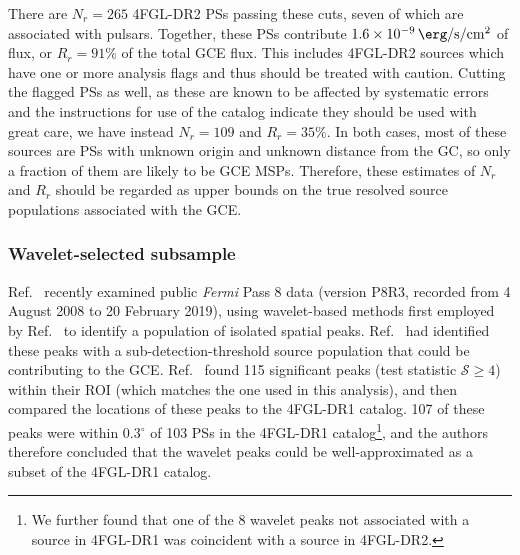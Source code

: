 \documentclass[letter,11pt]{article}
\begin{document}
There are $N_r=265$ 4FGL-DR2 PSs passing these cuts, seven of which are associated with pulsars. Together, these PSs contribute $\SI{1.6e-9}{\erg\per\second\per\centi\meter\squared}$ of flux, or $R_r = 91\%$ of the total GCE flux. This includes 4FGL-DR2 sources which have one or more analysis flags and thus should be treated with caution. Cutting the flagged PSs as well, as these are known to be affected by systematic errors and the instructions for use of the catalog indicate they should be used with great care, we have instead $N_r = 109$ and $R_r = 35\%$. In both cases, most of these sources are PSs with unknown origin and unknown distance from the GC, so only a fraction of them are likely to be GCE MSPs. Therefore, these estimates of $N_r$ and $R_r$ should be regarded as upper bounds on the true resolved source populations associated with the GCE. 

\subsubsection{Wavelet-selected subsample}

Ref.~\cite{Zhong:2019ycb} recently examined public {\it Fermi} Pass 8 data (version P8R3, recorded from 4 August 2008 to 20 February 2019), using wavelet-based methods first employed by Ref.~\cite{Bartels:2015aea} to identify a population of isolated spatial peaks. Ref.~\cite{Bartels:2015aea} had identified these peaks with a sub-detection-threshold source population that could be contributing to the GCE. Ref.~\cite{Zhong:2019ycb} found 115 significant peaks (test statistic $\mathcal{S} \geq 4$) within their ROI (which matches the one used in this analysis), and then compared the locations of these peaks to the 4FGL-DR1 catalog. 107 of these peaks were within 0.3$^\circ$ of 103 PSs in the 4FGL-DR1 catalog\footnote{We further found that one of the 8 wavelet peaks not associated with a source in 4FGL-DR1 was coincident with a source in 4FGL-DR2.}, and the authors therefore concluded that the wavelet peaks could be well-approximated as a subset of the 4FGL-DR1 catalog.
\end{document}

